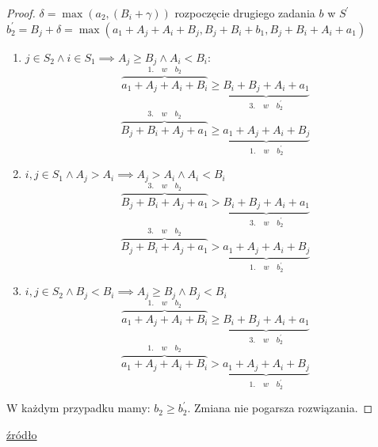 \documentclass{article}
\begin{document}
\begin{proof}
$\delta = \max(a_2,(B_i+\gamma))$ rozpoczęcie drugiego zadania $b$ w $S^\prime$\\
$b_2^\prime = B_j + \delta = \max(a_1+A_j+A_i+B_j, B_j + B_i +b_1, B_j+B_i +A_i+a_1)$\\
\clearpage
\begin{enumerate}
    \item $j \in S_2 \land i \in S_1 \implies A_j \geq B_j \land A_i < B_i$:
    $$
    \overbrace{a_1 + A_j + A_i + B_i}^{1. \quad w \quad b_2} \geq \underbrace{B_i + B_j + A_i + a_1}_{3. \quad w \quad b_2^\prime}
    $$
    $$
    \overbrace{B_j + B_i + A_j + a_1}^{3. \quad w \quad b_2} \geq \underbrace{a_1 + A_j + A_i + B_j}_{1. \quad w \quad b_2^\prime}
    $$
    \item $i,j \in S_1 \land A_j > A_i \implies A_j > A_i \land A_i < B_i$
    $$
    \overbrace{B_j + B_i + A_j + a_1}^{3. \quad w \quad b_2} > \underbrace{B_i + B_j + A_i + a_1}_{3. \quad w \quad b_2^\prime}
    $$
    $$
    \overbrace{B_j + B_i + A_j + a_1}^{3. \quad w \quad b_2} > \underbrace{a_1 + A_j + A_i + B_j}_{1. \quad w \quad b_2^\prime}
    $$
    \item $i,j \in S_2 \land B_j < B_i \implies A_j \geq B_j \land B_j < B_i$
    $$
    \overbrace{a_1 + A_j + A_i + B_i}^{1. \quad w \quad b_2} \geq \underbrace{B_i + B_j + A_i + a_1}_{3. \quad w \quad b_2^\prime}
    $$
    $$
    \overbrace{a_1 + A_j + A_i + B_i}^{1. \quad w \quad b_2} > \underbrace{a_1 + A_j + A_i + B_j}_{1. \quad w \quad b_2^\prime}
    $$
\end{enumerate}
W każdym przypadku mamy: $b_2 \geq b_2^\prime$. Zmiana nie pogarsza rozwiązania.
\end{proof}
\href{https://personal.utdallas.edu/~chandra/documents/6363/lec7.pdf}{źródło}
\clearpage
\setcounter{lemma}{0}
\end{document}
